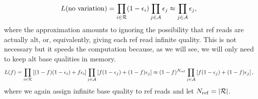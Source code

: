 \documentclass[nofootinbib,amssymb,amsmath]{revtex4}
\begin{document}
\begin{equation}
L({\rm no~variation}) = \prod_{i \in \mathcal{R}} (1 - \epsilon_i) \prod_{j \in \mathcal{A}} \epsilon_j \approx \prod_{j \in \mathcal{A}} \epsilon_j, 
\end{equation}
where the approximation amounts to ignoring the possibility that ref reads are actually alt, or, equivalently, giving each ref read infinite quality.  This is not necessary but it speeds the computation because, as we will see, we will only need to keep alt base qualities in memory.
\begin{equation}
L(f) = \prod_{i \in \mathcal{R}} \left[ (1 -f)(1 - \epsilon_i) + f \epsilon_i \right] \prod_{j \in \mathcal{A}} \left[f(1 - \epsilon_j) + (1 - f) \epsilon_j \right]
\approx (1-f)^{N_{\rm ref}} \prod_{j \in \mathcal{A}} \left[f(1 - \epsilon_j) + (1 - f) \epsilon_j \right],
\end{equation}
where we again assign infinite base quality to ref reads and let $N_{\rm ref} = | \mathcal{R}|$.
\end{document}
